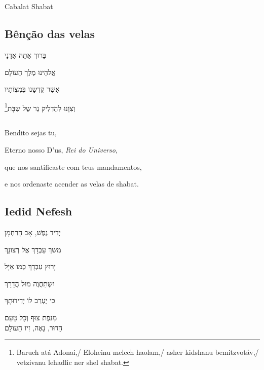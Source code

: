 \chapter*{}
\begin{center}
\begin{vplace}[0.3]
\Large
Cabalat Shabat
\end{vplace}
\end{center}
\thispagestyle{empty}


\movetoevenpage
\raggedleft

\section{Bênção das velas}

בָּרוּך אַתָּה אַדָנָי

אֱלהֵינוּ מֶלֶך הָעוֹלָם

אַשֶׁר קִדְשָנוּ בְּמִצְוֹתָיו

וְצִוָנוּ לְהַדְלִיק נֵר שֶל שַבָּת‏\footnote{Baruch atá Adonai,/ Eloheinu melech haolam,/ asher kidshanu bemitzvotáv,/ vetzivanu lehadlic ner shel shabat.}

\movetooddpage
\raggedright

\section{}

Bendito sejas tu,

Eterno nosso D'us, \emph{Rei do Universo},

que nos santificaste com teus mandamentos,

e nos ordenaste acender as velas de shabat.

\movetoevenpage
\raggedleft

\section{Iedid Nefesh}

יְדִיד נֶפֶשׁ, אָב הָרַחְמָן

מְשךְ עַבְדָךְ אֶל רְצונָךְ

יָרוּץ עַבְדָךְ כְמו אַיָל

יִשְתַחֲוֶה מוּל הֲדָרָךְ

כִּי יֶעְרַב לוֹ יְדִידוּתָךְ

מִנּפֶת צוּף וְכָל טָעַם\\[10pt]

הָדוּר, נָאֶה, זִיו הָעולָם


